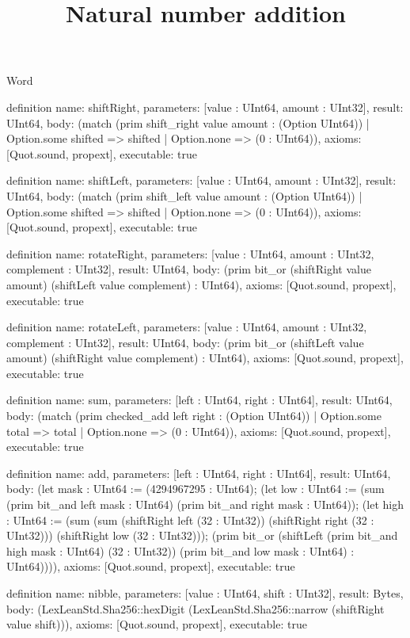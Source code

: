 \begin{lexlean}{Word}
\title{Natural number addition}
\begin{semanticmodule}
definition{
  name: shiftRight,
  parameters: [value : UInt64, amount : UInt32],
  result: UInt64,
  body: (match (prim shift_right value amount : (Option UInt64))
    | Option.some shifted => shifted
    | Option.none => (0 : UInt64)),
  axioms: [Quot.sound, propext],
  executable: true
}

definition{
  name: shiftLeft,
  parameters: [value : UInt64, amount : UInt32],
  result: UInt64,
  body: (match (prim shift_left value amount : (Option UInt64))
    | Option.some shifted => shifted
    | Option.none => (0 : UInt64)),
  axioms: [Quot.sound, propext],
  executable: true
}

definition{
  name: rotateRight,
  parameters: [value : UInt64, amount : UInt32, complement : UInt32],
  result: UInt64,
  body: (prim bit_or (shiftRight value amount) (shiftLeft value complement) : UInt64),
  axioms: [Quot.sound, propext],
  executable: true
}

definition{
  name: rotateLeft,
  parameters: [value : UInt64, amount : UInt32, complement : UInt32],
  result: UInt64,
  body: (prim bit_or (shiftLeft value amount) (shiftRight value complement) : UInt64),
  axioms: [Quot.sound, propext],
  executable: true
}

definition{
  name: sum,
  parameters: [left : UInt64, right : UInt64],
  result: UInt64,
  body: (match (prim checked_add left right : (Option UInt64))
    | Option.some total => total
    | Option.none => (0 : UInt64)),
  axioms: [Quot.sound, propext],
  executable: true
}

definition{
  name: add,
  parameters: [left : UInt64, right : UInt64],
  result: UInt64,
  body: (let mask : UInt64 := (4294967295 : UInt64); (let low : UInt64 := (sum (prim bit_and left mask : UInt64) (prim bit_and right mask : UInt64)); (let high : UInt64 := (sum (sum (shiftRight left (32 : UInt32)) (shiftRight right (32 : UInt32))) (shiftRight low (32 : UInt32))); (prim bit_or (shiftLeft (prim bit_and high mask : UInt64) (32 : UInt32)) (prim bit_and low mask : UInt64) : UInt64)))),
  axioms: [Quot.sound, propext],
  executable: true
}

definition{
  name: nibble,
  parameters: [value : UInt64, shift : UInt32],
  result: Bytes,
  body: (LexLeanStd.Sha256::hexDigit (LexLeanStd.Sha256::narrow (shiftRight value shift))),
  axioms: [Quot.sound, propext],
  executable: true
}


\end{semanticmodule}
\end{lexlean}
